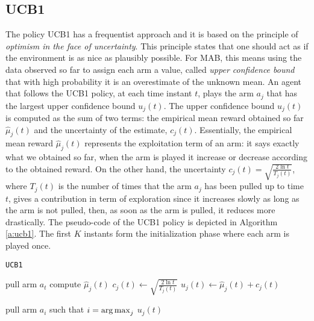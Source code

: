 \subsection*{UCB1}
The policy UCB1 has a frequentist approach and it is based on the principle of \emph{optimism in the face of uncertainty}. This principle states that one should act as if the environment is as nice as plausibly possible. For MAB, this means using the data observed so far to assign each arm a value, called \emph{upper confidence bound} that with high probability it is an overestimate of the unknown mean. An agent that follows the UCB1 policy,  at each time instant $t$, plays the arm $a_j$ that has the largest upper confidence bound $u_j(t)$. The upper confidence bound $u_j(t)$ is computed as the sum of two terms: the empirical mean reward obtained so far $\hat{\mu}_j(t)$ and the uncertainty of the estimate, $c_j(t)$. Essentially, the empirical mean reward $\hat{\mu}_j(t)$ represents the exploitation term of an arm: it says exactly what we obtained so far, when the arm is played it increase or decrease according to the obtained reward. On the other hand, the uncertainty $c_j(t) = \sqrt{\frac{2\ln t}{T_j(t)}}$, where  $T_j(t)$ is the number of times that the arm $a_j$ has been pulled up to time $t$, gives a contribution in term of exploration since it increases slowly as long as the arm is not pulled, then, as soon as the arm is pulled, it reduces more drastically.  The pseudo-code of the UCB1 policy is depicted in Algorithm \ref{a:ucb1}. The first $K$ instants form the initialization phase where each arm is played once. 

\begin{algorithm}[H]
	\caption{\texttt{UCB1}}
	\begin{scriptsize}
		\begin{algorithmic}[1]						
			 
			\State pull arm $a_t$ 
			\EndFor
			 
			\State compute $\hat{\mu}_j(t)$
			\State $c_j(t) \gets \sqrt{\frac{2\ln t}{T_j(t)}}$
			\State $u_j(t) \gets \hat{\mu}_j(t) + c_j(t)  $
			
			\EndFor
			\State pull arm $a_i$ such that  $i = \operatorname*{arg\,max}_j$ $u_j(t)$
			\EndFor	
		\end{algorithmic}
	\end{scriptsize}
	\label{a:ucb1}
\end{algorithm}


